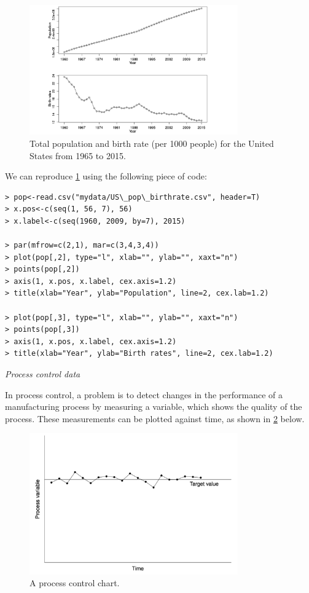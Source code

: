 \begin{figure}[h]
	\centering
	\includegraphics[width=0.8\textwidth]{Chapter 1/fig1-5.png}
	\caption{Total population and birth rate (per 1000 people) for the United States from 1965 to 2015.}
	\label{fig:1.5}
\end{figure}

We can reproduce \cref{fig:1.5} using the following piece of code:
\begin{verbatim}
> pop<-read.csv("mydata/US\_pop\_birthrate.csv", header=T)
> x.pos<-c(seq(1, 56, 7), 56)
> x.label<-c(seq(1960, 2009, by=7), 2015)

> par(mfrow=c(2,1), mar=c(3,4,3,4))
> plot(pop[,2], type="l", xlab="", ylab="", xaxt="n")
> points(pop[,2])
> axis(1, x.pos, x.label, cex.axis=1.2)
> title(xlab="Year", ylab="Population", line=2, cex.lab=1.2)

> plot(pop[,3], type="l", xlab="", ylab="", xaxt="n")
> points(pop[,3])
> axis(1, x.pos, x.label, cex.axis=1.2)
> title(xlab="Year", ylab="Birth rates", line=2, cex.lab=1.2)
\end{verbatim}

\textit{Process control data}

In process control, a problem is to detect changes in the performance of a manufacturing process by measuring a variable, which shows the quality of the process. These measurements can be plotted against time, as shown in \cref{fig:1.6} below.

\begin{figure}[h]
	\centering
	\includegraphics[width=0.8\textwidth]{Chapter 1/fig1-6.png}
	\caption{A process control chart.}
	\label{fig:1.6}
\end{figure}

